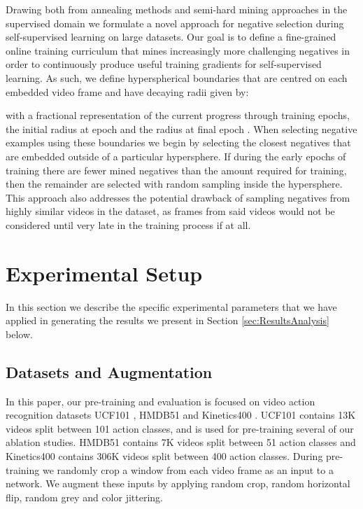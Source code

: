\documentclass[a4paper,conference]{IEEEtran}
\begin{document}
Drawing both from annealing methods and semi-hard mining approaches in the supervised domain \cite{schroff2015facenet,harwood2017smart} we formulate a novel approach for negative selection during self-supervised learning on large datasets. Our goal is to define a fine-grained online training curriculum that mines increasingly more challenging negatives in order to continuously produce useful training gradients for self-supervised learning. As such, we define hyperspherical boundaries that are centred on each embedded video frame and have decaying radii given by:



with  a fractional representation of the current progress through training epochs,  the initial radius at epoch  and  the radius at final epoch . When selecting negative examples using these boundaries we begin by selecting the closest negatives that are embedded outside of a particular hypersphere. If during the early epochs of training there are fewer mined negatives than the amount required for training, then the remainder are selected with random sampling inside the hypersphere.  This approach also addresses the potential drawback of sampling negatives from highly similar videos in the dataset, as frames from said videos would not be considered until very late in the training process if at all. \section{Experimental Setup}
\label{sec:experimental}
In this section we describe the specific experimental parameters that we have applied in generating the results we present in Section \ref{sec:ResultsAnalysis} below.

\subsection{Datasets and Augmentation}
\label{subsec:datasets}
In this paper, our pre-training and evaluation is focused on video action recognition datasets UCF101 \cite{soomro2012UCF101}, HMDB51 \cite{kuehne2011hmdb} and Kinetics400 \cite{kay2017kinetics}. UCF101 contains 13K videos split between 101 action classes, and is used for pre-training several of our ablation studies. HMDB51 contains 7K videos split between 51 action classes and Kinetics400 contains 306K videos split between 400 action classes. During pre-training we randomly crop a  window from each video frame as an input to a network. We augment these inputs by applying random crop, random horizontal flip, random grey and color jittering.
\end{document}
